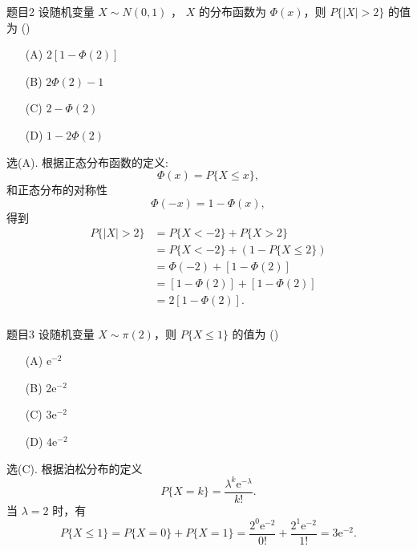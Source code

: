 \documentclass{article}
\begin{document}
\begin{question}{题目2}
    设随机变量 $X \sim N(0,1)$ ， $X$ 的分布函数为 $\Phi(x)$，则 $P\{|X|>2\}$ 的值为 (\quad \quad)
    \begin{multicols}{4}
        \begin{itemize}
            \item [(A)] $2[1 - \Phi(2)]$
            \item [(B)] $2\Phi(2) - 1$
            \item [(C)] $2 - \Phi(2)$
            \item [(D)] $1 - 2\Phi(2)$
        \end{itemize}
    \end{multicols}
\end{question}
\begin{solution}
    选(A).  根据正态分布函数的定义:
    $$
        \Phi(x) = P\{X \leqslant x\},
    $$
    和正态分布的对称性
    $$
        \Phi(-x) = 1 - \Phi(x),
    $$
    得到
    $$
        \begin{aligned}
            P\{|X|>2\}
             & = P\{X<-2\} + P\{X>2\}                 \\
             & = P\{X<-2\} + (1 - P\{X \leqslant 2\}) \\
             & = \Phi(-2) + [1 - \Phi(2)]             \\
             & = [1 - \Phi(2)] + [1 - \Phi(2)]        \\
             & = 2[1 - \Phi(2)].                      \\
        \end{aligned}
    $$
\end{solution}


\begin{question}{题目3}
    设随机变量 $X \sim \pi(2)$，则 $P\{X \leqslant 1\}$ 的值为 (\quad \quad)
    \begin{multicols}{4}
        \begin{itemize}
            \item [(A)] $\mathrm{e}^{-2}$
            \item [(B)] $2\mathrm{e}^{-2}$
            \item [(C)] $3\mathrm{e}^{-2}$
            \item [(D)] $4\mathrm{e}^{-2}$
        \end{itemize}
    \end{multicols}
\end{question}
\begin{solution}
    选(C). 根据泊松分布的定义
    $$
        P\{X=k\} = \frac{\lambda^k\mathrm{e}^{-\lambda}}{k!}.
    $$
    当 $\lambda = 2$ 时，有
    $$
        P\{X \leqslant 1\}
        = P\{X = 0\} + P\{X = 1\}
        = \frac{2^0 \mathrm{e}^{-2} }{0!} + \frac{2^1 \mathrm{e}^{-2} }{1!}
        = 3\mathrm{e}^{-2}.
    $$
\end{solution}
\end{document}
